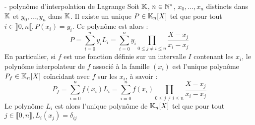 


\begin{theoreme}{16.66}{ - polynôme d'interpolation de Lagrange}
    Soit $\mathbb{K}$, $n \in \mathbb{N}^*$, $x_0, \dots, x_n$ distincts dans $\mathbb{K}$ et $y_0,\dots,y_n$ dans $\mathbb{K}$. Il existe un unique $P \in \mathbb{K}_n[X]$ tel que pour tout $i \in \rrbracket 0,n \llbracket, P(x_i) = y_i$. Ce polynôme est alors : $$ P = \sum_{i=0}^{n}y_i L_i = \sum_{i=0}^{n}y_i \prod_{0\leq j \neq i \leq n} \frac{X-x_j}{x_i-x_j}$$
    En particulier, si $f$ est une fonction définie sur un intervalle $I$ contenant les $x_i$, le polynôme interpolateur de $f$ associé à la famille $(x_i)$ est l'unique polynôme $P_f \in \mathbb{K}_n[X]$ coïncidant avec $f$ sur les $x_i$, à savoir : $$P_f = \sum_{i=0}^{n}f(x_i) L_i = \sum_{i=0}^{n}f(x_i) \prod_{0\leq j \neq i \leq n} \frac{X-x_j}{x_i-x_j}$$
    Le polynôme $L_i$ est alors l'unique polynôme de $\mathbb{K}_n[X]$ tel que pour tout $j \in \llbracket 0,n \rrbracket, L_i(x_j) = \delta_{ij}$
\end{theoreme}

